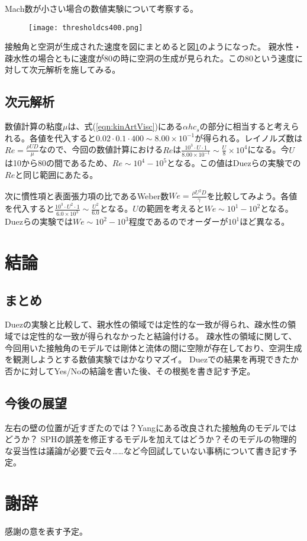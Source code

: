 \documentclass[]{jsarticle}
\begin{document}
Mach数が小さい場合の数値実験について考察する。
\begin{figure}[ht]
  \centering
  \texttt{[image: thresholdcs400.png]}
  \caption{\label{fig:threscs400} }
\end{figure}

接触角と空洞が生成された速度を図にまとめると図\ref{fig:threscs400}のようになった。
親水性・疎水性の場合ともに速度が80の時に空洞の生成が見られた。この80という速度に対して次元解析を施してみる。
\subsection{次元解析}
\label{subsec:label}
数値計算の粘度$\mu$は、式(\ref{eqn:kinArtVisc})にある$\alpha h c_s$の部分に相当すると考えられる。各値を代入すると$0.02\cdot 0.1 \cdot 400 \sim 8.00\times 10^{-1}$が得られる。レイノルズ数は$Re=\frac{\rho U D}{\mu}$なので、今回の数値計算における$Re$は$\frac{10^3\cdot U \cdot 1}{8.00\times10^{-1}}\sim \frac{U}{8}\times10^4$になる。今$U$は10から80の間であるため、$Re\sim 10^4-10^5$となる。この値はDuezらの実験での$Re$と同じ範囲にあたる。

次に慣性項と表面張力項の比であるWeber数$We=\frac{\rho U^2 D}{\gamma}$を比較してみよう。各値を代入すると$\frac{10^3\cdot U^2 \cdot 1}{6.0\times10^3}\sim \frac{U^2}{6.0}$となる。$U$の範囲を考えると$We\sim 10^1 -10^2$となる。Duezらの実験では$We\sim10^2-10^3$程度であるのでオーダーが$10^1$ほど異なる。



\newpage
\section{結論}
\subsection{まとめ}
Duezの実験と比較して、親水性の領域では定性的な一致が得られ、疎水性の領域では定性的な一致が得られなかったと結論付ける。
疎水性の領域に関して、今回用いた接触角のモデルでは剛体と流体の間に空隙が存在しており、空洞生成を観測しようとする数値実験ではかなりマズイ。
Duez\cite{Duez2007}での結果を再現できたか否かに対してYes/Noの結論を書いた後、その根拠を書き記す予定。
\subsection{今後の展望}
左右の壁の位置が近すぎたのでは？Yang\cite{Yang2017}にある改良された接触角のモデルではどうか？
SPHの誤差を修正するモデルを加えてはどうか？そのモデルの物理的な妥当性は議論が必要で云々……など今回試していない事柄について書き記す予定。
\newpage

\section{謝辞}
感謝の意を表す予定。
\newpage



\end{document}
